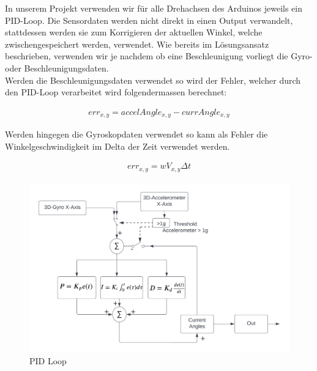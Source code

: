 In unserem Projekt verwenden wir für alle Drehachsen des Arduinos jeweils ein PID-Loop. 
Die Sensordaten werden nicht direkt in einen Output verwandelt, stattdessen werden sie zum Korrigieren der aktuellen Winkel, welche zwischengespeichert werden, verwendet.
Wie bereits im Lösungsansatz beschrieben, verwenden wir je nachdem ob eine Beschleunigung vorliegt die Gyro- oder Beschleunigungsdaten.\\
Werden die Beschleunigungsdaten verwendet so wird der Fehler, welcher durch den PID-Loop verarbeitet wird folgendermassen berechnet:

\begin{gather*} err_{x,y} = accelAngle_{x,y} - currAngle_{x,y} \end{gather*}

Werden hingegen die Gyroskopdaten verwendet so kann als Fehler die Winkelgeschwindigkeit im Delta der Zeit verwendet werden.

\begin{gather*} err_{x,y} = wV_{x,y}\Delta{t}\end{gather*}

\begin{figure}[H]
  \begin{center}
    \includegraphics[width=1\linewidth]{content/images/PID_Loop.png}
    \caption{PID Loop}
  \end{center}
\end{figure}
  
